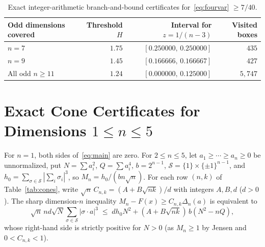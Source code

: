 \documentclass[11pt]{article}
\theoremstyle{plain}
\theoremstyle{definition}
\theoremstyle{remark}
\begin{document}
\begin{table}[ht]
\centering
\begin{tabular}{@{}lrrr@{}}
\toprule
Odd dimensions covered & Threshold $H$ & Interval for $z = 1/(n - 3)$ & Visited boxes \\
\midrule
$n = 7$ & $1.75$ & $[0.250000,\, 0.250000]$ & $435$ \\
$n = 9$ & $1.45$ & $[0.166666,\, 0.166667]$ & $427$ \\
All odd $n \ge 11$ & $1.24$ & $[0.000000,\, 0.125000]$ & $5{,}747$ \\
\bottomrule
\end{tabular}
\caption{Exact integer-arithmetic branch-and-bound certificates for~\eqref{eq:fourvar} $\ge 7/40$.}\label{tab:near}
\end{table}

\section{Exact Cone Certificates for Dimensions \texorpdfstring{$1 \le n \le 5$}{1 <= n <= 5}}\label{sec:small}

For $n = 1$, both sides of~\eqref{eq:main} are zero.
For $2 \le n \le 5$, let $a_1 \ge \cdots \ge a_n \ge 0$ be unnormalized, put $N = \sum a_i^2$, $Q = \sum a_i^4$, $b = 2^{n-1}$, $\mathcal{S} = \{1\} \times \{\pm 1\}^{n-1}$, and $h_0 = \sum_{\sigma \in \mathcal{S}} |\sum_i \sigma_i|^3$, so $M_n = h_0/(bn\sqrt{n})$.
For each row $(n, k)$ of Table~\ref{tab:cones}, write $\sqrt{n}\,C_{n,k} = (A + B\sqrt{nk})/d$ with integers $A, B, d$ ($d > 0$).
The sharp dimension-$n$ inequality $M_n - F(x) \ge C_{n,k}\Delta_n(a)$ is equivalent to
\begin{equation}\label{eq:cone-ineq}
\sqrt{n}\,nd\sqrt{N}\sum_{\sigma \in \mathcal{S}} |\sigma \cdot a|^3
\;\le\; d h_0 N^2 + (A + B\sqrt{nk})\,b(N^2 - nQ),
\end{equation}
whose right-hand side is strictly positive for $N > 0$ (as $M_n \ge 1$ by Jensen and $0 < C_{n,k} < 1$).
\end{document}
